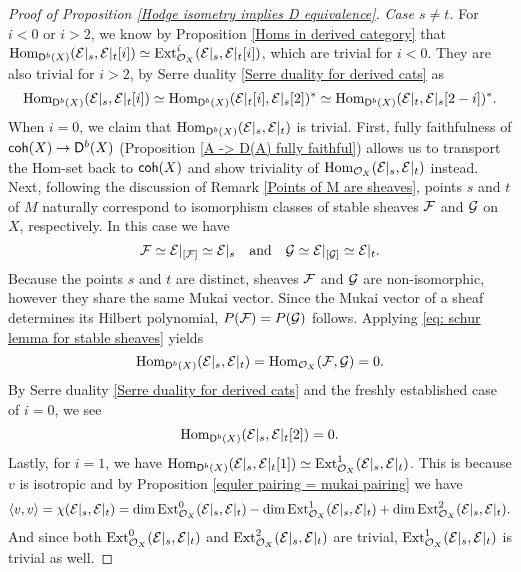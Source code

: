 \begin{proof}[Proof of Proposition \ref{Hodge isometry implies D equivalence}]
    \vspace{0.3cm}
    \noindent
    \textsl{Case $s \neq t$.}  
    For $i < 0$ or $i > 2$, we know by Proposition \ref{Homs in derived category} that $\mathrm{Hom}_{\mathsf{D}^b(X)}(\mathcal E|_s, \mathcal E|_t[i]) \simeq \operatorname{Ext}^i_{{\mathcal{O}_{X}}}(\mathcal E|_s, \mathcal E|_t[i])$, which are trivial for $i < 0$. They are also trivial for $i > 2$, by Serre duality \ref{Serre duality for derived cats} as
    \[
        \mathrm{Hom}_{\mathsf{D}^b(X)}(\mathcal E|_s, \mathcal E|_t[i]) \simeq \mathrm{Hom}_{\mathsf{D}^b(X)}(\mathcal E|_t[i], \mathcal E|_s[2])^* \simeq \mathrm{Hom}_{\mathsf{D}^b(X)}(\mathcal E|_t, \mathcal E|_s[2-i])^*.
    \]
    When $i = 0$, we claim that $\mathrm{Hom}_{\mathsf{D}^b(X)}(\mathcal E|_s, \mathcal E|_t)$ is trivial. First, fully faithfulness of $\mathsf{coh}(X) \to \mathsf{D}^b(X)$ (\cf Proposition \ref{A -> D(A) fully faithful}) allows us to transport the Hom-set back to $\mathsf{coh}(X)$ and show triviality of $\mathrm{Hom}_{{\mathcal{O}_{X}}}(\mathcal E|_s, \mathcal E|_t)$ instead. Next, following the discussion of Remark \ref{Points of M are sheaves}, points $s$ and $t$ of $M$ naturally correspond to isomorphism classes of stable sheaves $\mathcal F$ and $\mathcal G$ on $X$, respectively. In this case we have
    \[
        \mathcal F \simeq \mathcal E|_{[\mathcal F]} \simeq \mathcal E|_s \quad \text{and} \quad \mathcal G \simeq \mathcal E|_{[\mathcal G]} \simeq \mathcal E|_t.
    \]
    Because the points $s$ and $t$ are distinct, sheaves $\mathcal F$ and $\mathcal G$ are non-isomorphic, however they share the same Mukai vector. Since the Mukai vector of a sheaf determines its Hilbert polynomial, $P(\mathcal F) = P(\mathcal G)$ follows. Applying \eqref{eq: schur lemma for stable sheaves} yields 
    \[
        \mathrm{Hom}_{\mathsf{D}^b(X)}(\mathcal E|_s, \mathcal E|_t) = \mathrm{Hom}_{{\mathcal{O}_{X}}}(\mathcal F, \mathcal G)= 0. 
    \]
    By Serre duality \ref{Serre duality for derived cats} and the freshly established case of $i = 0$, we see 
    \[
        \mathrm{Hom}_{\mathsf{D}^b(X)}(\mathcal E|_s, \mathcal E|_t[2]) = 0.
    \]
    Lastly, for $i = 1$, we have $\mathrm{Hom}_{\mathsf{D}^b(X)}(\mathcal E|_s, \mathcal E|_t[1]) \simeq \operatorname{Ext}^1_{\mathcal{O}_{X}}(\mathcal E|_s, \mathcal E|_t)$. This is because $v$ is isotropic and by Proposition \ref{equler pairing = mukai pairing} we have
    \[
        \langle v, v \rangle = \chi(\mathcal E|_s, \mathcal E|_t) = \dim\operatorname{Ext}^0_{\mathcal{O}_{X}}(\mathcal E|_s, \mathcal E|_t) - \dim\operatorname{Ext}^1_{\mathcal{O}_{X}}(\mathcal E|_s, \mathcal E|_t) + \dim\operatorname{Ext}^2_{\mathcal{O}_{X}}(\mathcal E|_s, \mathcal E|_t).
    \]
    And since both $\operatorname{Ext}^0_{\mathcal{O}_{X}}(\mathcal E|_s, \mathcal E|_t)$ and $\operatorname{Ext}^2_{\mathcal{O}_{X}}(\mathcal E|_s, \mathcal E|_t)$ are trivial, $\operatorname{Ext}^1_{\mathcal{O}_{X}}(\mathcal E|_s, \mathcal E|_t)$ is trivial as well.


\end{proof}
